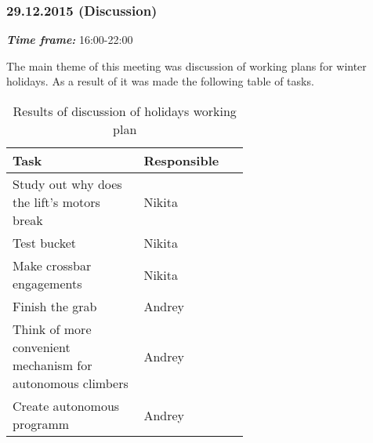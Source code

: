 \subsubsection{29.12.2015 (Discussion)}
\textit{\textbf{Time frame:}} 16:00-22:00 \newline

The main theme of this meeting was discussion of working plans for winter holidays. As a result of it was made the following table of tasks.
\begin{table}[H]
	\caption{Results of discussion of holidays working plan}
	\label{tabular:meetingSPB28.12}
	\begin{center}
		\begin{tabular}{|p{0.4\linewidth}|p{0.2\linewidth}|}
			\hline
			Task & Responsible \\
			\hline
			Study out why does the lift's motors break & Nikita \\
			\hline
			Test bucket & Nikita \\
			\hline
			Make crossbar engagements	& Nikita \\
			\hline
			Finish the grab & Andrey \\
			\hline
			Think of more convenient mechanism for autonomous climbers & Andrey \\
			\hline
			Create autonomous programm & Andrey \\
			\hline
		\end{tabular}
	\end{center}
\end{table}
